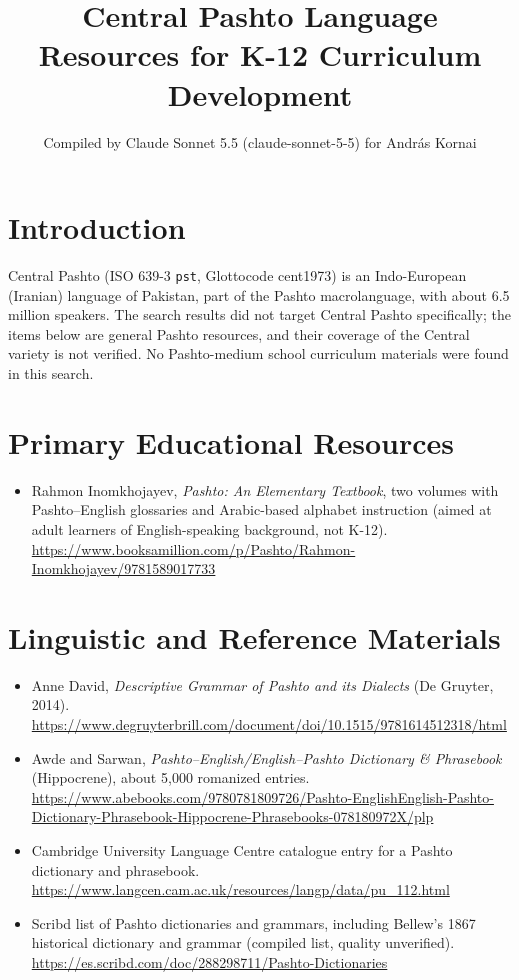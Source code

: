 \documentclass[12pt]{article}
\title{Central Pashto Language Resources for K-12 Curriculum Development}
\author{Compiled by Claude Sonnet 5.5 (claude-sonnet-5-5) for Andr\'as Kornai}
\date{}
\begin{document}
\maketitle

\section{Introduction}
Central Pashto (ISO 639-3 \texttt{pst}, Glottocode cent1973) is an Indo-European (Iranian) language of Pakistan, part of the Pashto macrolanguage, with about 6.5 million speakers. The search results did not target Central Pashto specifically; the items below are general Pashto resources, and their coverage of the Central variety is not verified. No Pashto-medium school curriculum materials were found in this search.

\section{Primary Educational Resources}
\begin{itemize}
\item Rahmon Inomkhojayev, \emph{Pashto: An Elementary Textbook}, two volumes with Pashto--English glossaries and Arabic-based alphabet instruction (aimed at adult learners of English-speaking background, not K-12). \url{https://www.booksamillion.com/p/Pashto/Rahmon-Inomkhojayev/9781589017733}
\end{itemize}

\section{Linguistic and Reference Materials}
\begin{itemize}
\item Anne David, \emph{Descriptive Grammar of Pashto and its Dialects} (De Gruyter, 2014). \url{https://www.degruyterbrill.com/document/doi/10.1515/9781614512318/html}
\item Awde and Sarwan, \emph{Pashto--English/English--Pashto Dictionary \& Phrasebook} (Hippocrene), about 5{,}000 romanized entries. \url{https://www.abebooks.com/9780781809726/Pashto-EnglishEnglish-Pashto-Dictionary-Phrasebook-Hippocrene-Phrasebooks-078180972X/plp}
\item Cambridge University Language Centre catalogue entry for a Pashto dictionary and phrasebook. \url{https://www.langcen.cam.ac.uk/resources/langp/data/pu_112.html}
\item Scribd list of Pashto dictionaries and grammars, including Bellew's 1867 historical dictionary and grammar (compiled list, quality unverified). \url{https://es.scribd.com/doc/288298711/Pashto-Dictionaries}
\end{itemize}
\end{document}
